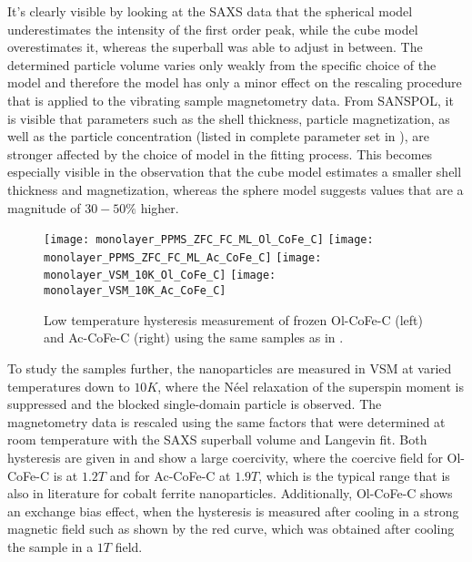 \documentclass[\main/dresen_thesis.tex]{subfiles}
\begin{document}
    It's clearly visible by looking at the SAXS data that the spherical model underestimates the intensity of the first order peak, while the cube model overestimates it, whereas the superball was able to adjust in between.
    The determined particle volume varies only weakly from the specific choice of the model and therefore the model has only a minor effect on the rescaling procedure that is applied to the vibrating sample magnetometry data.
    From SANSPOL, it is visible that parameters such as the shell thickness, particle magnetization, as well as the particle concentration (listed in complete parameter set in ), are stronger affected by the choice of model in the fitting process.
    This becomes especially visible in the observation that the cube model estimates a smaller shell thickness and magnetization, whereas the sphere model suggests values that are a magnitude of $30 - 50 \unit{\%}$ higher.

    \begin{figure}[tb]
      \centering
      \texttt{[image: monolayer\_PPMS\_ZFC\_FC\_ML\_Ol\_CoFe\_C]}
      \texttt{[image: monolayer\_PPMS\_ZFC\_FC\_ML\_Ac\_CoFe\_C]}
      \texttt{[image: monolayer\_VSM\_10K\_Ol\_CoFe\_C]}
      \texttt{[image: monolayer\_VSM\_10K\_Ac\_CoFe\_C]}
      \caption{\label{fig:monolaye rs:nanoparticle:vsm10K}Low temperature hysteresis measurement of frozen Ol-CoFe-C (left) and Ac-CoFe-C (right) using the same samples as in .}
    \end{figure}

    To study the samples further, the nanoparticles are measured in VSM at varied temperatures down to $10 \unit{K}$, where the N\'eel relaxation of the superspin moment is suppressed and the blocked single-domain particle is observed.
    The magnetometry data is rescaled using the same factors that were determined at room temperature with the SAXS superball volume and Langevin fit.
    Both hysteresis are given in  and show a large coercivity, where the coercive field for Ol-CoFe-C is at $1.2 \unit{T}$ and for Ac-CoFe-C at $1.9 \unit{T}$, which is the typical range that is also in literature for cobalt ferrite nanoparticles.
    Additionally, Ol-CoFe-C shows an exchange bias effect, when the hysteresis is measured after cooling in a strong magnetic field such as shown by the red curve, which was obtained after cooling the sample in a $1 \unit{T}$ field.
\end{document}
